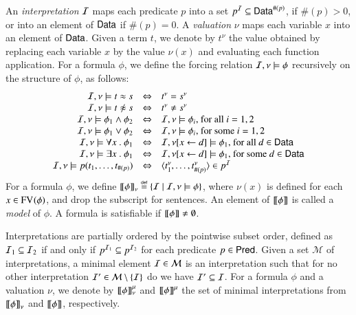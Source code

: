 \documentclass{llncs}
\begin{document}

An \emph{interpretation} $\mathcal{I}$ maps each predicate $p$ into a set $p^{\mathcal{I}}
\subseteq \mathsf{Data}^{\#(p)}$, if $\#(p)>0$, or into an element of $\mathsf{Data}$
if $\#(p)=0$. A \emph{valuation} $\nu$ maps each variable $x$ into an
element of $\mathsf{Data}$. Given a term $t$, we denote by $t^\nu$ the value
obtained by replacing each variable $x$ by the value $\nu(x)$ and
evaluating each function application. For a formula $\phi$, we define
the forcing relation $\mathcal{I},\nu \models \phi$ recursively on the
structure of $\phi$, as follows:
\[
\begin{array}{rcl}
\I,\nu \models t \teq s & \iff & t^\nu=s^\nu \\
\I,\nu \models t \not\teq s & \iff & t^\nu \neq s^\nu \\
\I,\nu \models \phi_1 \wedge \phi_2 & \iff & \I,\nu \models \phi_i \text{, for all } i=1,2 \\ 
\I,\nu \models \phi_1 \vee \phi_2 & \iff & \I,\nu \models \phi_i \text{, for some } i=1,2 \\
\I,\nu \models \forall x ~.~ \phi_1 & \iff & \I,\nu[x\leftarrow d] \models \phi_1 \text{, for all } d \in \Data \\
\I,\nu \models \exists x ~.~ \phi_1 & \iff & \I,\nu[x\leftarrow d] \models \phi_1 \text{, for some } d \in \Data \\
\I,\nu \models p(t_1,\ldots,t_{\#(p)}) & \iff & \tuple{t_1^\nu,\ldots,t_{\#(p)}^\nu} \in p^\I 
\end{array}
\]
For a formula $\phi$, we define ${\bf [\![} \phi {\bf ]\!]}_\nu \stackrel{\scriptscriptstyle{\mathsf{def}}}{=} \{ \mathcal{I} \mid
  \mathcal{I},\nu \models \phi \}$, where $\nu(x)$ is defined for each $x \in
\mathrm{FV}_{}(\phi)$, and drop the subscript for sentences. An element of
${\bf [\![} \phi {\bf ]\!]}$ is called a \emph{model} of $\phi$. A formula is
satisfiable if ${\bf [\![} \phi {\bf ]\!]}\neq\emptyset$. 

Interpretations are partially ordered by the pointwise subset order,
defined as $\mathcal{I}_1 \subseteq \mathcal{I}_2$ if and only if $p^{\mathcal{I}_1} \subseteq
p^{\mathcal{I}_2}$ for each predicate $p \in \mathsf{Pred}$. Given a set $\mathcal{M}$
of interpretations, a minimal element $\mathcal{I} \in \mathcal{M}$ is an
interpretation such that for no other interpretation $\mathcal{I}' \in
\mathcal{M} \setminus \{ \mathcal{I} \}$ do we have $\mathcal{I}' \subseteq \mathcal{I}$. For a
formula $\phi$ and a valuation $\nu$, we denote by ${\bf [\![} \phi {\bf ]\!]}^\mu_\nu$
and ${\bf [\![} \phi {\bf ]\!]}^\mu$ the set of minimal interpretations from
${\bf [\![} \phi {\bf ]\!]}_\nu$ and ${\bf [\![} \phi {\bf ]\!]}$, respectively.
\end{document}
